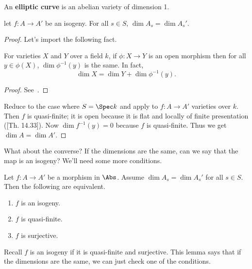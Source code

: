 \begin{df}
An \textbf{elliptic curve} is an abelian variety of dimension 1.
\end{df}
\begin{lem}
let $f:A\to A'$ be an isogeny. For all $s\in S$, $\dim A_s=\dim A_s'$.
\end{lem}
\begin{proof}%
Let's import the following fact. 
\begin{lem}
For varieties $X$ and $Y$ over a field $k$, if $\phi:X\to Y$ is an open morphism then for all $y\in \phi(X)$, $\dim\phi^{-1}(y)$ is the same. In fact,
\[
\dim X=\dim Y+\dim \phi^{-1}(y).
\]
\end{lem}
\begin{proof}
See~\cite[Th. 14.114 and Pr. 14.102]{GW}.
\end{proof}
Reduce to the case where $S=\Spec k$ and apply to $f:A\to A'$ varieties over $k$. Then $f$ is quasi-finite; it is open because it is flat and locally of finite presentation (\cite{GW}[Th. 14.33]). Now $\dim f^{-1}(y)=0$ because $f$ is quasi-finite. %
Thus we get $\dim A=\dim A'$.
\end{proof}
What about the converse? If the dimensions are the same, can we say that the map is an isogeny? We'll need some more conditions.
\begin{lem}
Let $f:A\to A'$ be a morphism in $\Abs$. Assume $\dim A_s=\dim A_s'$ for all $s\in S$. Then the following are equivalent.
\begin{enumerate}
\item
$f$ is an isogeny. %
\item
$f$ is quasi-finite.
\item
$f$ is surjective.
\end{enumerate}
\end{lem}
Recall $f$ is an isogeny if it is quasi-finite and surjective. This lemma says that if the dimensions are the same, we can just check one of the conditions.

